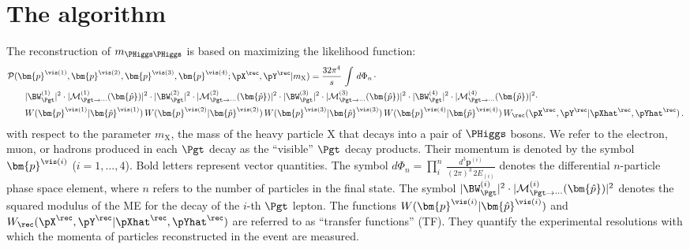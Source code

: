 \section{The algorithm}
\label{sec:algorithm}

The reconstruction of $m_{\PHiggs\PHiggs}$ is based on maximizing the likelihood function:
\begin{align}
&
\mathcal{P}(\bm{p}^{\vis(1)},\bm{p}^{\vis(2)},\bm{p}^{\vis(3)},\bm{p}^{\vis(4)};\pX^{\rec},\pY^{\rec}|m_{\textrm{X}})
= \frac{32\pi^{4}}{s} \, \int \, d\Phi_{n} \, \cdot \hspace{2cm} \nonumber \\
& \qquad \vert \BW^{(1)}_{\Pgt} \vert^{2} \cdot \vert \mathcal{M}^{(1)}_{\Pgt\to\cdots}(\bm{\hat{p}}) \vert^{2} 
 \cdot \vert \BW^{(2)}_{\Pgt} \vert^{2} \cdot \vert \mathcal{M}^{(2)}_{\Pgt\to\cdots}(\bm{\hat{p}}) \vert^{2}
 \cdot \vert \BW^{(3)}_{\Pgt} \vert^{2} \cdot \vert \mathcal{M}^{(3)}_{\Pgt\to\cdots}(\bm{\hat{p}}) \vert^{2}
 \cdot \vert \BW^{(4)}_{\Pgt} \vert^{2} \cdot \vert \mathcal{M}^{(4)}_{\Pgt\to\cdots}(\bm{\hat{p}}) \vert^{2} \cdot \nonumber \\
& \qquad W(\bm{p}^{\vis(1)}|\bm{\hat{p}}^{\vis(1)}) \, W(\bm{p}^{\vis(2)}|\bm{\hat{p}}^{\vis(2)}) \, W(\bm{p}^{\vis(3)}|\bm{\hat{p}}^{\vis(3)}) \, W(\bm{p}^{\vis(4)}|\bm{\hat{p}}^{\vis(4)}) 
 \, W_{\rec}( \pX^{\rec},\pY^{\rec} | \pXhat^{\rec},\pYhat^{\rec} ) \, .
\label{eq:likelihood_with_hadRecoil}
\end{align}
with respect to the parameter $m_{\textrm{X}}$, 
the mass of the heavy particle $\textrm{X}$ that decays into a pair of $\PHiggs$ bosons.
We refer to the electron, muon, or hadrons produced in each $\Pgt$ decay as the ``visible'' $\Pgt$ decay products.
Their momentum is denoted by the symbol $\bm{p}^{\vis(i)}$ ($i = 1,\ldots,4$).
Bold letters represent vector quantities.
The symbol $d\Phi_{n} = \prod_{i}^{n} \,
\frac{d^{3}\bm{p}^{(i)}}{(2\pi)^{3} \, 2 E_{(i)}}$ denotes the differential $n$-particle phase space element,
where $n$ refers to the number of particles in the final state.
The symbol $\vert \BW^{(i)}_{\Pgt} \vert^{2} \cdot \vert \mathcal{M}^{(i)}_{\Pgt\to\cdots}(\bm{\hat{p}}) \vert^{2}$ 
denotes the squared modulus of the ME for the decay of the $i$-th $\Pgt$ lepton.
The functions $W(\bm{p}^{\vis(i)}|\bm{\hat{p}}^{\vis(i)})$ and $W_{\rec}( \pX^{\rec},\pY^{\rec} | \pXhat^{\rec},\pYhat^{\rec} )$ are referred to as ``transfer functions'' (TF).
They quantify the experimental resolutions with which the momenta of particles reconstructed in the event are measured.
